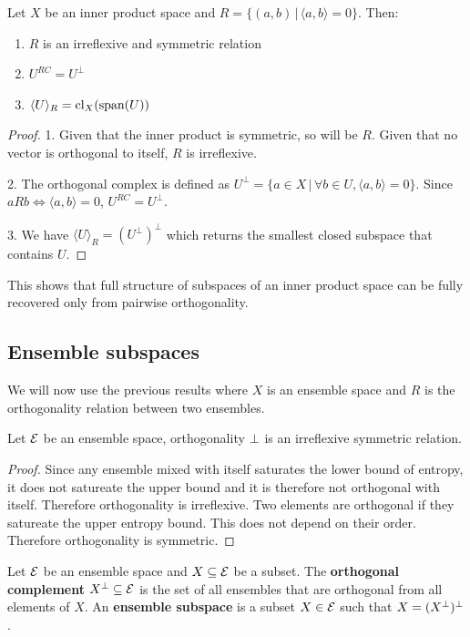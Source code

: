 \begin{prop}
	Let $X$ be an inner product space and $R = \{(a,b) \,|\, \langle a , b\rangle = 0\}$. Then:
	\begin{enumerate}
		\item $R$ is an irreflexive and symmetric relation
		\item $U^{RC} = U^{\perp}$
		\item $\langle U \rangle_R = \mathrm{cl}_X (\mathrm{span}(U))$
	\end{enumerate}
\end{prop}

\begin{proof}
	1. Given that the inner product is symmetric, so will be $R$. Given that no vector is orthogonal to itself, $R$ is irreflexive.
	
	2. The orthogonal complex is defined as $U^\perp = \{ a \in X \, | \, \forall b \in U, \langle a , b\rangle = 0 \}$. Since $aRb \iff \langle a , b\rangle = 0$, $U^{RC} = U^{\perp}$.
	
	3. We have $\langle U \rangle_R = (U^{\perp})^\perp$ which returns the smallest closed subspace that contains $U$.
\end{proof}

This shows that full structure of subspaces of an inner product space can be fully recovered only from pairwise orthogonality.

\subsection{Ensemble subspaces}

We will now use the previous results where $X$ is an ensemble space and $R$ is the orthogonality relation between two ensembles.

\begin{prop}
	Let $\mathcal{E}$ be an ensemble space, orthogonality $\perp$ is an irreflexive symmetric relation.
\end{prop}

\begin{proof}
	Since any ensemble mixed with itself saturates the lower bound of entropy, it does not satureate the upper bound and it is therefore not orthogonal with itself. Therefore orthogonality is irreflexive. Two elements are orthogonal if they satureate the upper entropy bound. This does not depend on their order. Therefore orthogonality is symmetric.
\end{proof}

\begin{defn}
	Let $\mathcal{E}$ be an ensemble space and $X \subseteq \mathcal{E}$ be a subset. The \textbf{orthogonal complement} $X^\perp \subseteq \mathcal{E}$ is the set of all ensembles that are orthogonal from all elements of $X$. An \textbf{ensemble subspace} is a subset $X \in \mathcal{E}$ such that $X = (X^\perp)^\perp$.
\end{defn}

